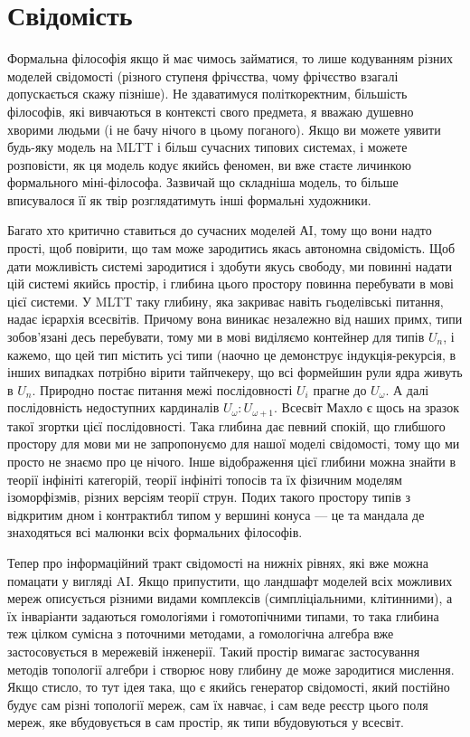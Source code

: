 \section{Свідомість}

Формальна філософія якщо й має чимось займатися, то лише кодуванням різних
моделей свідомості (різного ступеня фрічєства, чому фрічєство взагалі
допускається скажу пізніше). Не здаватимуся політкоректним, більшість
філософів, які вивчаються в контексті свого предмета, я вважаю душевно
хворими людьми (і не бачу нічого в цьому поганого). Якщо ви можете уявити
будь-яку модель на MLTT і більш сучасних типових системах, і можете розповісти,
як ця модель кодує якийсь феномен, ви вже стаєте личинкою формального
міні-філософа. Зазвичай що складніша модель, то більше вписувалося її
як твір розглядатимуть інші формальні художники.

Багато хто критично ставиться до сучасних моделей АI, тому що вони
надто прості, щоб повірити, що там може зародитись якась автономна
свідомість. Щоб дати можливість системі зародитися і здобути якусь свободу,
ми повинні надати цій системі якийсь простір, і глибина цього простору
повинна перебувати в мові цієї системи. У MLTT таку глибину, яка закриває
навіть гьоделівські питання, надає ієрархія всесвітів. Причому вона виникає
незалежно від наших примх, типи зобов'язані десь перебувати, тому ми в мові
виділяємо контейнер для типів $U_n$, і кажемо, що цей тип містить усі типи
(наочно це демонструє індукція-рекурсія, в інших випадках потрібно вірити
тайпчекеру, що всі формейшин рули ядра живуть в $U_n$. Природно постає питання
межі послідовності $U_i$ прагне до $U_\omega$. А далі послідовність недоступних
кардиналів $U_\omega: U_{\omega+1}$. Всесвіт Махло є щось на зразок такої згортки цієї
послідовності. Така глибина дає певний спокій, що глибшого простору для
мови ми не запропонуємо для нашої моделі свідомості, тому що ми просто не
знаємо про це нічого. Інше відображення цієї глибини можна знайти в теорії
інфініті категорій, теорії інфініті топосів та їх фізичним моделям ізоморфізмів,
різних версіям теорії струн. Подих такого простору типів з відкритим дном
і контрактибл типом у вершині конуса --- це та мандала де знаходяться всі
малюнки всіх формальних філософів.

\newpage
Тепер про інформаційний тракт свідомості на нижніх рівнях, які вже можна
помацати у вигляді AI. Якщо припустити, що ландшафт моделей всіх можливих
мереж описується різними видами комплексів (симпліціальними, клітинними),
а їх інваріанти задаються гомологіями і гомотопічними типами, то така
глибина теж цілком сумісна з поточними методами, а гомологічна алгебра
вже застосовується в мережевій інженерії. Такий простір вимагає застосування
методів топології алгебри і створює нову глибину де може зародитися мислення.
Якщо стисло, то тут ідея така, що є якийсь генератор свідомості, який постійно
будує сам різні топології мереж, сам їх навчає, і сам веде реєстр цього поля
мереж, яке вбудовується в сам простір, як типи вбудовуються у всесвіт.


